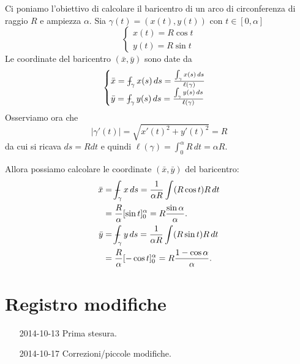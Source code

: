 \documentclass[italian,a4paper]{scrartcl}
\newcommand{\defeq}{=}
\def\Xint#1{\mathchoice
{\XXint\displaystyle\textstyle{#1}}%
{\XXint\textstyle\scriptstyle{#1}}%
{\XXint\scriptstyle\scriptscriptstyle{#1}}%
{\XXint\scriptscriptstyle\scriptscriptstyle{#1}}%
\!\int}
\def\XXint#1#2#3{{\setbox0=\hbox{$#1{#2#3}{\int}$ }
\vcenter{\hbox{$#2#3$ }}\kern-.6\wd0}}
\def\dashint{\Xint-}
\begin{document}
\begin{exercise}
Ci poniamo l'obiettivo di calcolare il baricentro di un arco di
circonferenza di raggio $R$ e ampiezza $\alpha$.
Sia $\gamma(t) = (x(t),y(t))$ con $t\in [0,\alpha]$
\[
\begin{cases}
x(t) = R \cos t \\
y(t) = R \sin t
\end{cases}
\]
Le coordinate del baricentro $(\bar x, \bar y)$ sono date da
\[
\begin{cases}
\bar x = \dashint_\gamma x(s)\, ds \defeq \frac{\int_\gamma x(s)\, ds}{\ell(\gamma)}\\
\bar y = \dashint_\gamma y(s)\, ds \defeq \frac{\int_\gamma y(s)\, ds}{\ell(\gamma)}
\end{cases}
\]
Osserviamo ora che 
\[
  \lvert \gamma'(t)\rvert = \sqrt{ x'(t)^2 + y'(t)^2}
  = R
\]
da cui si ricava $ds = R dt$ e quindi 
$\ell(\gamma) = \int_0^\alpha R\, dt = \alpha R$.

Allora possiamo calcolare le coordinate $(\bar x,\bar y)$ del baricentro:
\begin{align*}
\bar x & = \dashint_\gamma x\, ds = 
\frac{1}{\alpha R} \int (R\cos t) R\, dt \\
& = 
\frac{R}{\alpha}[\sin t]_0^\alpha 
= R \frac{\sin \alpha}{\alpha}.\\
\bar y &= \dashint_\gamma y\, ds = 
\frac{1}{\alpha R} \int (R\sin t) R\, dt \\
& = \frac{R}{\alpha} [-\cos t]_0^\alpha 
 = R\frac{1-\cos \alpha}{\alpha}.
\end{align*}
\end{exercise}

\section{Registro modifiche}
\begin{itemize}
\item[2014-10-13] Prima stesura.
\item[2014-10-17] Correzioni/piccole modifiche.
\end{itemize}
\end{document}
